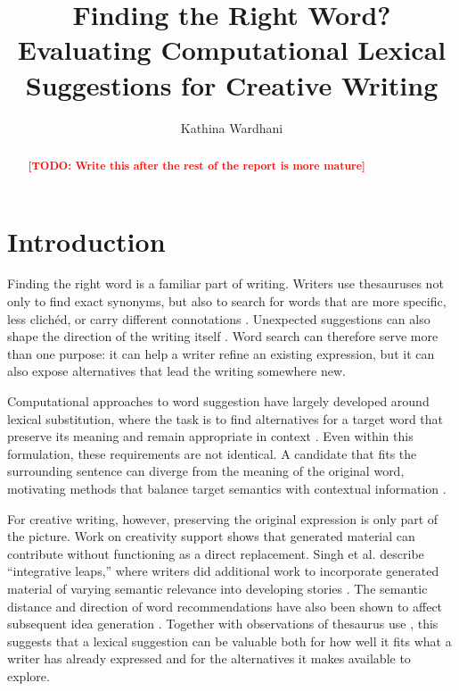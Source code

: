 \documentclass[sigconf,nonacm]{acmart}
\newcommand{\todo}[1]{\textcolor{red}{\textbf{[TODO: #1]}}}
\begin{document}
\raggedbottom

\title{Finding the Right Word? Evaluating Computational Lexical Suggestions for Creative Writing}

\author{Kathina Wardhani}

\begin{abstract}
\todo{Write this after the rest of the report is more mature}
\end{abstract}

\maketitle


\section{Introduction}

Finding the right word is a familiar part of writing. Writers use thesauruses not only to find exact synonyms, but also to search for words that are more specific, less clichéd, or carry different connotations \cite{gero2019stylistic}. Unexpected suggestions can also shape the direction of the writing itself \cite{gero2019stylistic}. Word search can therefore serve more than one purpose: it can help a writer refine an existing expression, but it can also expose alternatives that lead the writing somewhere new.

Computational approaches to word suggestion have largely developed around lexical substitution, where the task is to find alternatives for a target word that preserve its meaning and remain appropriate in context \cite{zhou2019bert,omarov2023grounding}. Even within this formulation, these requirements are not identical. A candidate that fits the surrounding sentence can diverge from the meaning of the original word, motivating methods that balance target semantics with contextual information \cite{zhou2019bert}. 

For creative writing, however, preserving the original expression is only part of the picture. Work on creativity support shows that generated material can contribute without functioning as a direct replacement. Singh et al. describe ``integrative leaps,'' where writers did additional work to incorporate generated material of varying semantic relevance into developing stories \cite{singh2022elephant}. The semantic distance and direction of word recommendations have also been shown to affect subsequent idea generation
\cite{wise2024sparking}. Together with observations of thesaurus use \cite{gero2019stylistic}, this suggests that a lexical suggestion can be valuable both for how well it fits what a writer has already expressed and for the alternatives it makes available to explore.
\end{document}
